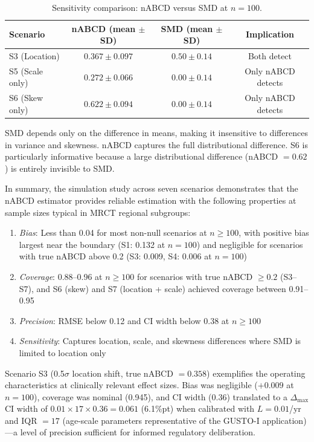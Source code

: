 \documentclass[AMA,Times1COL]{WileyNJDv5}
\begin{document}
\begin{table}[ht]
\centering
\caption{Sensitivity comparison: nABCD versus SMD at $n=100$.\label{tab:smd}}
\begin{tabular}{lccc}
\toprule
\textbf{Scenario} & \textbf{nABCD (mean $\pm$ SD)} & \textbf{SMD (mean $\pm$ SD)} & \textbf{Implication} \\
\midrule
S3 (Location) & $0.367 \pm 0.097$ & $0.50 \pm 0.14$ & Both detect \\
S5 (Scale only) & $0.272 \pm 0.066$ & $0.00 \pm 0.14$ & Only nABCD detects \\
S6 (Skew only) & $0.622 \pm 0.094$ & $0.00 \pm 0.14$ & Only nABCD detects \\
\bottomrule
\end{tabular}
\begin{tablenotes}
\item SMD depends only on the difference in means, making it insensitive to differences in variance and skewness. nABCD captures the full distributional difference. S6 is particularly informative because a large distributional difference (nABCD $= 0.62$) is entirely invisible to SMD.
\end{tablenotes}
\end{table}

In summary, the simulation study across seven scenarios demonstrates that the nABCD estimator provides reliable estimation with the following properties at sample sizes typical in MRCT regional subgroups:
\begin{enumerate}[1.]
\item \emph{Bias}: Less than 0.04 for most non-null scenarios at $n \geq 100$, with positive bias largest near the boundary (S1: 0.132 at $n = 100$) and negligible for scenarios with true nABCD above 0.2 (S3: 0.009, S4: 0.006 at $n = 100$)
\item \emph{Coverage}: 0.88--0.96 at $n \geq 100$ for scenarios with true nABCD $\geq 0.2$ (S3--S7), and S6 (skew) and S7 (location + scale) achieved coverage between 0.91--0.95
\item \emph{Precision}: RMSE below 0.12 and CI width below 0.38 at $n \geq 100$
\item \emph{Sensitivity}: Captures location, scale, and skewness differences where SMD is limited to location only
\end{enumerate}

Scenario S3 (0.5$\sigma$ location shift, true nABCD $= 0.358$) exemplifies the operating characteristics at clinically relevant effect sizes. Bias was negligible ($+0.009$ at $n = 100$), coverage was nominal (0.945), and CI width (0.36) translated to a $\Delta_{\max}$ CI width of $0.01 \times 17 \times 0.36 = 0.061$ (6.1\%pt) when calibrated with $L = 0.01$/yr and IQR $= 17$ (age-scale parameters representative of the GUSTO-I application)---a level of precision sufficient for informed regulatory deliberation.
\end{document}
